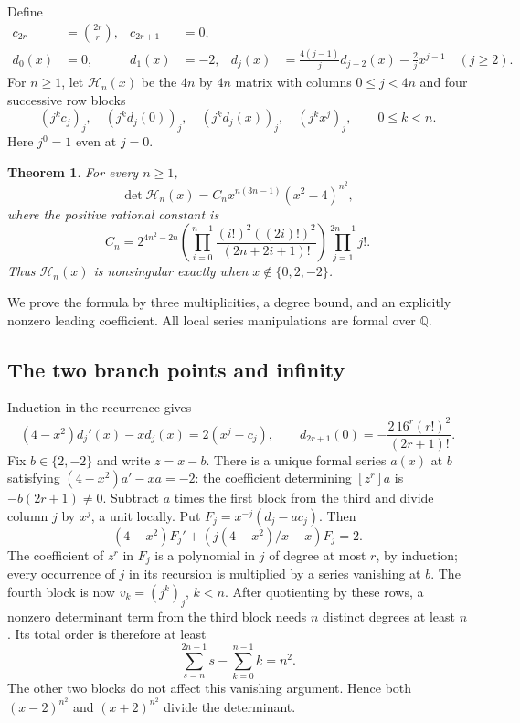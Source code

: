 \documentclass[11pt,a4paper]{article}
\numberwithin{equation}{section}
\newtheorem{theorem}{Theorem}[section]
\theoremstyle{definition}\newtheorem{definition}[theorem]{Definition}
\theoremstyle{remark}\newtheorem{remark}[theorem]{Remark}
\newcommand{\Q}{\mathbb Q}\newcommand{\Z}{\mathbb Z}\newcommand{\R}{\mathbb R}
\begin{document}
Define
\begin{align*}
 c_{2r}&=\binom{2r}r,&c_{2r+1}&=0,\\
 d_0(x)&=0,&d_1(x)&=-2,&
 d_j(x)&=\frac{4(j-1)}j d_{j-2}(x)-\frac2j x^{j-1}\quad(j\ge2).
\end{align*}
For $n\ge1$, let $\mathcal H_n(x)$ be the $4n$ by $4n$ matrix with columns $0\le j<4n$ and four successive row blocks
\begin{equation}\label{normal:H}
 (j^k c_j)_j,\quad(j^k d_j(0))_j,\quad(j^k d_j(x))_j,\quad(j^k x^j)_j,
 \qquad 0\le k<n.
\end{equation}
Here $j^0=1$ even at $j=0$.

\begin{theorem}\label{normal:main}
For every $n\ge1$,
\begin{equation}\label{normal:formula}
 \det\mathcal H_n(x)=C_n x^{n(3n-1)}(x^2-4)^{n^2},
\end{equation}
where the positive rational constant is
\begin{equation}\label{normal:constant}
 C_n=2^{4n^2-2n}
 \left(\prod_{i=0}^{n-1}\frac{(i!)^2((2i)!)^2}{(2n+2i+1)!}\right)
 \prod_{j=1}^{2n-1}j!.
\end{equation}
Thus $\mathcal H_n(x)$ is nonsingular exactly when $x\notin\{0,2,-2\}$.
\end{theorem}
We prove the formula by three multiplicities, a degree bound, and an explicitly nonzero leading coefficient. All local series manipulations are formal over $\Q$.

\subsection{The two branch points and infinity}
Induction in the recurrence gives
\begin{equation}\label{normal:ode}
 (4-x^2)d_j'(x)-x d_j(x)=2(x^j-c_j),\qquad
 d_{2r+1}(0)=-\frac{2\,16^r(r!)^2}{(2r+1)!}.
\end{equation}
Fix $b\in\{2,-2\}$ and write $z=x-b$. There is a unique formal series $a(x)$ at $b$ satisfying
$(4-x^2)a'-xa=-2$: the coefficient determining $[z^r]a$ is $-b(2r+1)\ne0$.
Subtract $a$ times the first block from the third and divide column $j$ by $x^j$, a unit locally. Put $F_j=x^{-j}(d_j-a c_j)$. Then
\[
 (4-x^2)F_j'+\left(j(4-x^2)/x-x\right)F_j=2.
\]
The coefficient of $z^r$ in $F_j$ is a polynomial in $j$ of degree at most $r$, by induction; every occurrence of $j$ in its recursion is multiplied by a series vanishing at $b$.
The fourth block is now $v_k=(j^k)_j$, $k<n$. After quotienting by these rows, a nonzero determinant term from the third block needs $n$ distinct degrees at least $n$. Its total order is therefore at least
\[
 \sum_{s=n}^{2n-1}s-\sum_{k=0}^{n-1}k=n^2.
\]
The other two blocks do not affect this vanishing argument. Hence both $(x-2)^{n^2}$ and $(x+2)^{n^2}$ divide the determinant.
\end{document}
